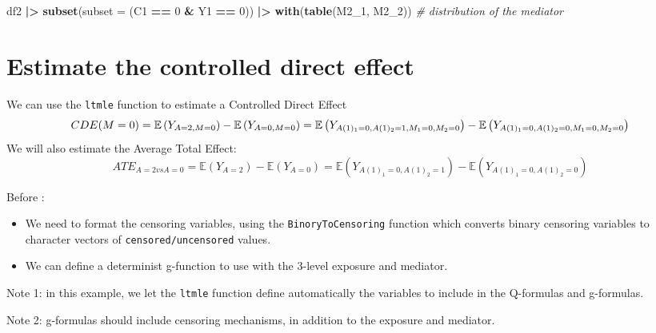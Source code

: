 \documentclass[
]{book}
\newenvironment{Shaded}{\begin{snugshade}}{\end{snugshade}}
\newcommand{\AttributeTok}[1]{\textcolor[rgb]{0.13,0.29,0.53}{#1}}
\newcommand{\CommentTok}[1]{\textcolor[rgb]{0.56,0.35,0.01}{\textit{#1}}}
\newcommand{\DecValTok}[1]{\textcolor[rgb]{0.00,0.00,0.81}{#1}}
\newcommand{\FunctionTok}[1]{\textcolor[rgb]{0.13,0.29,0.53}{\textbf{#1}}}
\newcommand{\NormalTok}[1]{#1}
\newcommand{\SpecialCharTok}[1]{\textcolor[rgb]{0.81,0.36,0.00}{\textbf{#1}}}
\providecommand{\tightlist}{%
  \setlength{\itemsep}{0pt}\setlength{\parskip}{0pt}}
\begin{document}
\begin{Shaded}
\begin{Highlighting}[]
\NormalTok{df2 }\SpecialCharTok{|\textgreater{}} 
  \FunctionTok{subset}\NormalTok{(}\AttributeTok{subset =}\NormalTok{ (C1 }\SpecialCharTok{==} \DecValTok{0} \SpecialCharTok{\&}\NormalTok{ Y1 }\SpecialCharTok{==} \DecValTok{0}\NormalTok{)) }\SpecialCharTok{|\textgreater{}}
  \FunctionTok{with}\NormalTok{(}\FunctionTok{table}\NormalTok{(M2\_1, M2\_2)) }\CommentTok{\# distribution of the mediator}
\end{Highlighting}
\end{Shaded}

\section{Estimate the controlled direct effect}\label{estimate-the-controlled-direct-effect}

We can use the \texttt{ltmle} function to estimate a Controlled Direct Effect
\begin{equation*} \small
  CDE(M=0) = \mathbb{E}\left(Y_{A=2, M=0} \right) - \mathbb{E}\left(Y_{A=0, M=0} \right) = \mathbb{E}\left(Y_{A(1)_1=0, A(1)_2 = 1, M_1 = 0, M_2 = 0} \right) - \mathbb{E}\left(Y_{A(1)_1=0, A(1)_2 = 0, M_1 = 0, M_2 = 0} \right)
\end{equation*}
We will also estimate the Average Total Effect:
\begin{equation*}
  ATE_{A=2 vs A=0} = \mathbb{E}\left(Y_{A=2} \right) - \mathbb{E}\left(Y_{A=0} \right) = \mathbb{E}\left(Y_{A(1)_1=0, A(1)_2 = 1} \right) - \mathbb{E}\left(Y_{A(1)_1=0, A(1)_2 = 0} \right)
\end{equation*}

Before :

\begin{itemize}
\tightlist
\item
  We need to format the censoring variables, using the \texttt{BinoryToCensoring} function which converts binary censoring variables to character vectors of \texttt{censored/uncensored} values.
\item
  We can define a determinist g-function to use with the 3-level exposure and mediator.
\end{itemize}

Note 1: in this example, we let the \texttt{ltmle} function define automatically the variables to include in the Q-formulas and g-formulas.

Note 2: g-formulas should include censoring mechanisms, in addition to the exposure and mediator.
\end{document}

